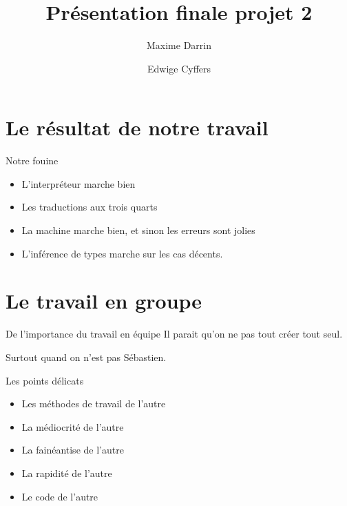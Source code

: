 \documentclass{beamer}
\title{Présentation finale projet 2}
\author{Maxime Darrin  \and Edwige Cyffers }
\institute{}
\date{}
\begin{document}
\maketitle

\begin{frame}
\tableofcontents
\end{frame}


\section{Le résultat de notre travail}

\begin{frame}{Notre fouine}

  \begin{itemize}
  \item L'interpréteur marche bien \pause
  \item Les traductions aux trois quarts \pause
  \item La machine marche bien, et sinon les erreurs sont jolies \pause
  \item L'inférence de types marche sur les cas décents.\pause

  \end{itemize}
  
\end{frame}

\section{Le travail en groupe}

\begin{frame}{De l'importance du travail en équipe}
	Il parait qu'on ne pas tout créer tout seul. 
	
	Surtout quand on n'est pas Sébastien.
\end{frame}

\begin{frame}{Les points délicats}
	\begin{itemize}
		\item Les méthodes de travail de l'autre \pause
		\item La médiocrité de l'autre \pause
		\item La fainéantise de l'autre \pause
		\item La rapidité de l'autre\pause
		\item Le code de l'autre \pause
	\end{itemize}
	
\end{frame}
\end{document}
